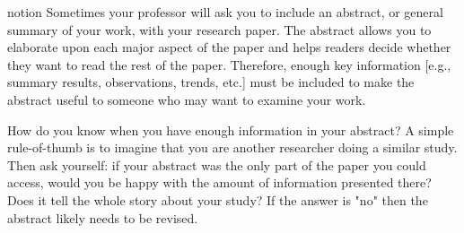 notion
Sometimes your professor will ask you to include an abstract, or general summary of your work, with your research paper. The abstract allows you to elaborate upon each major aspect of the paper and helps readers decide whether they want to read the rest of the paper. Therefore, enough key information [e.g., summary results, observations, trends, etc.] must be included to make the abstract useful to someone who may want to examine your work.

How do you know when you have enough information in your abstract? A simple rule-of-thumb is to imagine that you are another researcher doing a similar study. Then ask yourself: if your abstract was the only part of the paper you could access, would you be happy with the amount of information presented there? Does it tell the whole story about your study? If the answer is "no" then the abstract likely needs to be revised.
